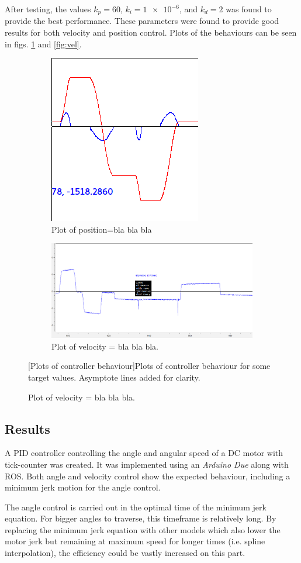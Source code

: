 \documentclass[11pt]{article}
\begin{document}
After testing, the values $k_p = 60$, $k_i = \num{1e-6}$, and $k_d = 2$ was found to provide the best performance. These parameters were found to provide good results for both velocity and position control. Plots of the behaviours can be seen in figs. \ref{fig:pos} and \vref{fig:vel}. \par

\begin{figure}[h]
  \begin{subfigure}[b]{.45\textwidth}
    \includegraphics[width=.5\textwidth]{figures/posplot.png}
    \caption{Plot of position=bla bla bla}\label{fig:pos}
  \end{subfigure} 
  \begin{subfigure}[b]{.45\textwidth}
    \includegraphics[width=.5\textwidth]{figures/velplot.png}
    \caption{Plot of velocity = bla bla bla.}    \label{fig:ve}
  \end{subfigure}
  [Plots of controller behaviour]{Plots of controller behaviour for some target values. Asymptote lines added for clarity.}
\end{figure}
\subsection{Results}
A PID controller controlling the angle and angular speed of a DC motor with tick-counter was created. It was implemented using an \emph{Arduino Due} along with ROS. Both angle and velocity control show the expected behaviour, including a minimum jerk motion for the angle control.\par
The angle control is carried out in the optimal time of the minimum jerk equation. For bigger angles to traverse, this timeframe is relatively long. By replacing the minimum jerk equation with other models which also lower the motor jerk but remaining at maximum speed for longer times (i.e. spline interpolation), the efficiency could be vastly increased on this part.
\end{document}
